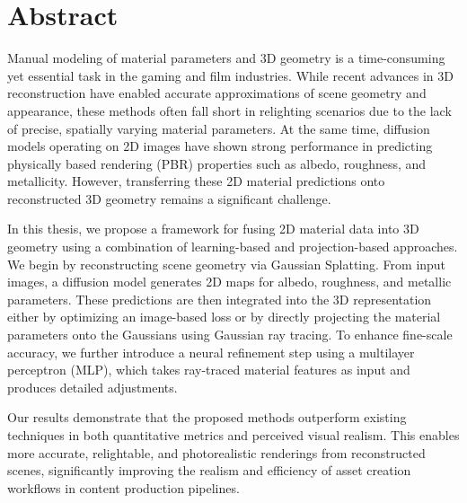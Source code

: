 \chapter*{Abstract}
Manual modeling of material parameters and 3D geometry is a time-consuming yet essential task in the gaming and film industries. While recent advances in 3D reconstruction have enabled accurate approximations of scene geometry and appearance, these methods often fall short in relighting scenarios due to the lack of precise, spatially varying material parameters. At the same time, diffusion models operating on 2D images have shown strong performance in predicting physically based rendering (PBR) properties such as albedo, roughness, and metallicity. However, transferring these 2D material predictions onto reconstructed 3D geometry remains a significant challenge.

In this thesis, we propose a framework for fusing 2D material data into 3D geometry using a combination of learning-based and projection-based approaches. We begin by reconstructing scene geometry via Gaussian Splatting. From input images, a diffusion model generates 2D maps for albedo, roughness, and metallic parameters. These predictions are then integrated into the 3D representation either by optimizing an image-based loss or by directly projecting the material parameters onto the Gaussians using Gaussian ray tracing. To enhance fine-scale accuracy, we further introduce a neural refinement step using a multilayer perceptron (MLP), which takes ray-traced material features as input and produces detailed adjustments.

Our results demonstrate that the proposed methods outperform existing techniques in both quantitative metrics and perceived visual realism. This enables more accurate, relightable, and photorealistic renderings from reconstructed scenes, significantly improving the realism and efficiency of asset creation workflows in content production pipelines. 